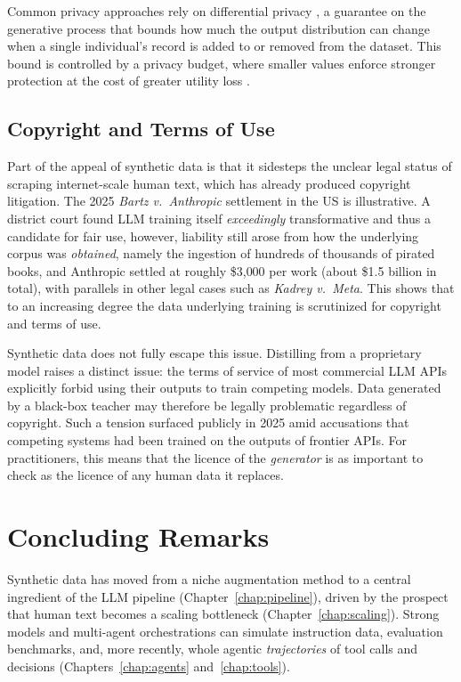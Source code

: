 Common privacy  approaches rely on differential privacy \citep{dwork2006calibrating}, a guarantee on the generative process that bounds how much the output distribution can change when a single individual's record is added to or removed from the dataset. This bound is controlled by a privacy budget, where smaller values enforce stronger protection at the cost of greater utility loss \citep{yue-etal-2023-synthetic}.


\subsection{Copyright and Terms of Use}
Part of the appeal of synthetic data is that it sidesteps the unclear legal status of scraping internet-scale human text, which has already produced copyright litigation. %
The 2025 \emph{Bartz v.\ Anthropic} settlement in the US is illustrative. A district court found LLM training itself {\em exceedingly} transformative and thus a candidate for fair use, however, liability still arose from how the underlying corpus was \emph{obtained}, namely the ingestion of hundreds of thousands of pirated books, and Anthropic settled at roughly \$3{,}000 per work (about \$1.5 billion in total), with parallels in other legal cases such as \emph{Kadrey v.\ Meta}. This shows that to an increasing degree the data underlying training is scrutinized for copyright and terms of use.

Synthetic data does not fully escape this issue. Distilling from a proprietary model raises a distinct issue: the terms of service of most commercial LLM APIs explicitly forbid using their outputs to train competing models. Data generated by a black-box teacher may therefore be legally problematic regardless of copyright. Such a tension  surfaced publicly in 2025 amid accusations that competing systems had been trained on the outputs of frontier APIs. For practitioners, this means that the licence of the \emph{generator} is as important to check as the licence of any human data it replaces.


\section{Concluding Remarks}
Synthetic data has moved from a niche augmentation method to a central ingredient of the LLM pipeline (Chapter~\ref{chap:pipeline}), driven by the prospect that human text becomes a scaling bottleneck (Chapter~\ref{chap:scaling}). Strong models and multi-agent orchestrations can simulate instruction data, evaluation benchmarks, and, more recently, whole agentic \emph{trajectories} of tool calls and decisions (Chapters~\ref{chap:agents} and~\ref{chap:tools}). 


